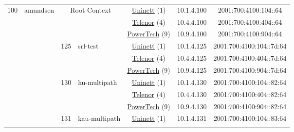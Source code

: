 \begin{small}
\begin{center}
\begin{longtable}{|c|c|c|c|c|c|c|c|}
 \multirow{30}{*}{\tiny{100}} & \multicolumn{1}{|l|}{\multirow{30}{*}{\tiny{amundsen}}} & \multicolumn{2}{|c|}{\multirow{3}{*}{\tiny{Root Context}}} & \multicolumn{2}{|c|}{\tiny{\href{https://www.uninett.no}{Uninett} (1)}} & \tiny{10.1.4.100} & \tiny{2001:700:4100:104::64} \\* \cline{5-5}\cline{6-6}\cline{7-7}\cline{8-8}
  &  & \multicolumn{2}{|c|}{} & \multicolumn{2}{|c|}{\tiny{\href{https://www.telenor.no}{Telenor} (4)}} & \tiny{10.4.4.100} & \tiny{2001:700:4100:404::64} \\* \cline{5-5}\cline{6-6}\cline{7-7}\cline{8-8}
  &  & \multicolumn{2}{|c|}{} & \multicolumn{2}{|c|}{\tiny{\href{http://www.powertech.no}{PowerTech} (9)}} & \tiny{10.9.4.100} & \tiny{2001:700:4100:904::64} \\* \cline{3-3}\cline{4-4}\cline{5-5}\cline{6-6}\cline{7-7}\cline{8-8}
  &  & \multirow{3}{*}{\tiny{125}} & \multicolumn{1}{|l|}{\multirow{3}{*}{\tiny{srl-test}}} & \multicolumn{2}{|c|}{\tiny{\href{https://www.uninett.no}{Uninett} (1)}} & \tiny{10.1.4.125} & \tiny{2001:700:4100:104::7d:64} \\* \cline{5-5}\cline{6-6}\cline{7-7}\cline{8-8}
  &  &  &  & \multicolumn{2}{|c|}{\tiny{\href{https://www.telenor.no}{Telenor} (4)}} & \tiny{10.4.4.125} & \tiny{2001:700:4100:404::7d:64} \\* \cline{5-5}\cline{6-6}\cline{7-7}\cline{8-8}
  &  &  &  & \multicolumn{2}{|c|}{\tiny{\href{http://www.powertech.no}{PowerTech} (9)}} & \tiny{10.9.4.125} & \tiny{2001:700:4100:904::7d:64} \\* \cline{3-3}\cline{4-4}\cline{5-5}\cline{6-6}\cline{7-7}\cline{8-8}
  &  & \multirow{3}{*}{\tiny{130}} & \multicolumn{1}{|l|}{\multirow{3}{*}{\tiny{hu-multipath}}} & \multicolumn{2}{|c|}{\tiny{\href{https://www.uninett.no}{Uninett} (1)}} & \tiny{10.1.4.130} & \tiny{2001:700:4100:104::82:64} \\* \cline{5-5}\cline{6-6}\cline{7-7}\cline{8-8}
  &  &  &  & \multicolumn{2}{|c|}{\tiny{\href{https://www.telenor.no}{Telenor} (4)}} & \tiny{10.4.4.130} & \tiny{2001:700:4100:404::82:64} \\* \cline{5-5}\cline{6-6}\cline{7-7}\cline{8-8}
  &  &  &  & \multicolumn{2}{|c|}{\tiny{\href{http://www.powertech.no}{PowerTech} (9)}} & \tiny{10.9.4.130} & \tiny{2001:700:4100:904::82:64} \\* \cline{3-3}\cline{4-4}\cline{5-5}\cline{6-6}\cline{7-7}\cline{8-8}
  &  & \multirow{3}{*}{\tiny{131}} & \multicolumn{1}{|l|}{\multirow{3}{*}{\tiny{kau-multipath}}} & \multicolumn{2}{|c|}{\tiny{\href{https://www.uninett.no}{Uninett} (1)}} & \tiny{10.1.4.131} & \tiny{2001:700:4100:104::83:64} \\* \cline{5-5}\cline{6-6}\cline{7-7}\cline{8-8}

\end{longtable}
\end{center}
\end{small}
